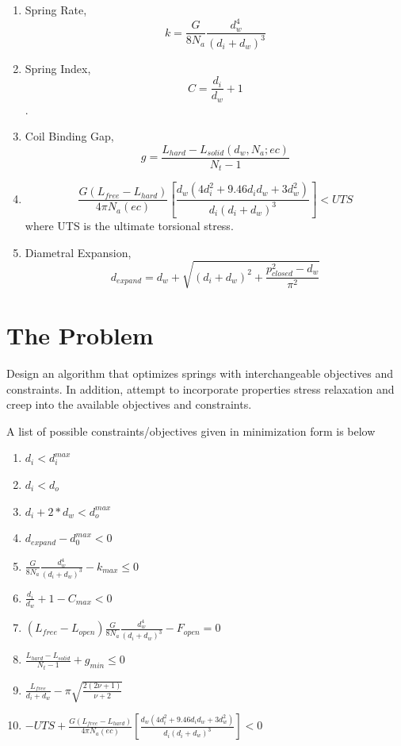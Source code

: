 \documentclass[10pt]{article}
\begin{document}
			\begin{enumerate}
				\item Spring Rate, $$k = \frac{G}{8N_{a}}\frac{d_{w}^{4}}{(d_{i} + d_{w})^{3}}$$
				
				\item Spring Index, $$C = \frac{d_{i}}{d_{w}} + 1$$.
				
				\item Coil Binding Gap, $$g = \frac{L_{hard} - L_{solid}(d_{w},N_{a}; ec)}{N_{t} - 1}$$
		
				\item $$\frac{G(L_{free} - L_{hard})}{4 \pi N_{a} (ec)} \left[\frac{d_{w} (4d_{i}^{2} + 9.46d_{i} 
d_{w} + 3 d_{w}^{2})}{d_{i}(d_{i}+d_{w})^{3}}\right]< UTS$$ where UTS is the ultimate torsional stress.
		
				\item Diametral Expansion, $$d_{expand} = d_{w} + \sqrt{(d_{i} + d_{w})^{2} + 
				\frac{p_{closed}^{2} - d_{w}}{\pi^{2}}}$$
			\end{enumerate}
			
\section{The Problem} 

Design an algorithm that optimizes springs with interchangeable objectives and constraints. In addition, attempt to incorporate properties stress relaxation and creep into the available objectives and constraints. 

A list of possible constraints/objectives given in minimization form is below

\begin{enumerate}
\item $d_{i} < d_{i}^{max}$
\item $d_{i} < d_{o}$
\item $d_{i} + 2*d_{w} < d_{o}^{max}$
\item$d_{expand} - d_{0}^{max} < 0 $
\item$ \frac{G}{8N_{a}}\frac{d_{w}^{4}}{(d_{i} + d_{w})^{3}} - k_{max} \le 0 $
\item $\frac{d_{i}}{d_{w}} + 1 - C_{max}< 0$
\item $(L_{free} - L_{open})\frac{G}{8N_{a}}\frac{d_{w}^{4}}{(d_{i} + d_{w})^{3}} - F_{open} = 0 $
\item $\frac{L_{hard} - L_{solid}}{N_{t} - 1} + g_{min} \le  0$
\item$\frac{L_{free}}{d_{i} + d_{w}} - \pi \sqrt{\frac{2(2 \nu + 1)}{\nu + 2}}$
\item$-UTS + \frac{G(L_{free} - L_{hard})}{4 \pi N_{a} (ec)} \left[\frac{d_{w} (4d_{i}^{2} + 9.46d_{i} 
d_{w} + 3 d_{w}^{2})}{d_{i}(d_{i}+d_{w})^{3}}\right] < 0$
\end{enumerate}	
\end{document}
